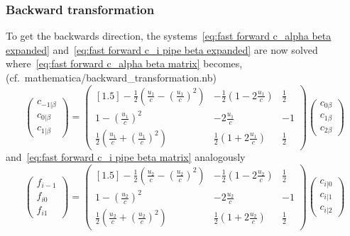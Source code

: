 \documentclass{article}
\begin{document}
\subsubsection{Backward transformation}
\label{subs:Backward transformation}
To get the backwards direction, the systems~\eqref{eq:fast forward c_alpha beta expanded}
and~\eqref{eq:fast forward c_i pipe beta expanded} are now solved where~\eqref{eq:fast forward c_alpha beta matrix} becomes, (cf.\ mathematica/backward\_transformation.nb)
\begin{equation}
  \begin{pmatrix}
    c_{-1|\beta} \\
    c_{0|\beta} \\
    c_{1|\beta}
  \end{pmatrix}
  =
  \begin{pmatrix}[1.5]
    -\frac{1}{2}(\frac{u_1}{c} - {(\frac{u_1}{c})}^2) &
    -\frac{1}{2}(1 - 2\frac{u_1}{c}) &
    \frac{1}{2} \\
    1 - {(\frac{u_1}{c})}^2  &
    -2\frac{u_1}{c}  &
    -1 \\
    \frac{1}{2}(\frac{u_1}{c} + {(\frac{u_1}{c})}^2)  &
    \frac{1}{2}(1 + 2\frac{u_1}{c})  &
    \frac{1}{2}
  \end{pmatrix}
  \begin{pmatrix}
    c_{0\beta} \\
    c_{1\beta} \\
    c_{2\beta}
  \end{pmatrix}
\end{equation}
and~\eqref{eq:fast forward c_i pipe beta matrix} analogously
\begin{equation}
  \begin{pmatrix}
    f_{i-1} \\
    f_{i0} \\
    f_{i1}
  \end{pmatrix}
  =
  \begin{pmatrix}[1.5]
    -\frac{1}{2}(\frac{u_2}{c} - {(\frac{u_2}{c})}^2) &
    -\frac{1}{2}(1 - 2\frac{u_2}{c}) &
    \frac{1}{2} \\
    1 - {(\frac{u_2}{c})}^2  &
    -2\frac{u_2}{c}  &
    -1 \\
    \frac{1}{2}(\frac{u_2}{c} + {(\frac{u_2}{c})}^2)  &
    \frac{1}{2}(1 + 2\frac{u_2}{c})  &
    \frac{1}{2}
  \end{pmatrix}
  \begin{pmatrix}
      c_{i|0} \\
      c_{i|1} \\
      c_{i|2}
    \end{pmatrix}
\end{equation}
\end{document}
